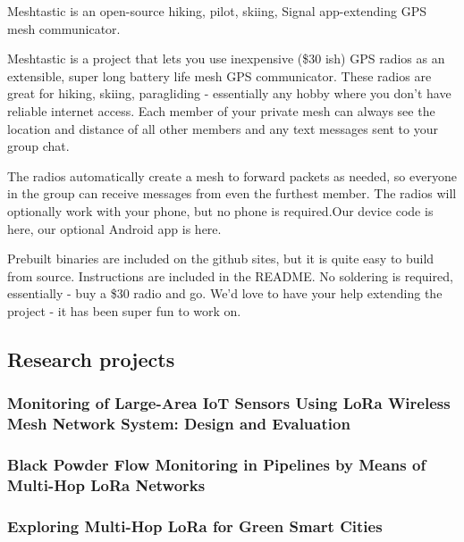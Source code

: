 						
					Meshtastic is an open-source hiking, pilot, skiing, Signal app-extending GPS mesh communicator.
					
					Meshtastic is a project that lets you use inexpensive (\$30 ish) GPS radios as an extensible, super long battery life mesh GPS communicator. These radios are great for hiking, skiing, paragliding - essentially any hobby where you don’t have reliable internet access. Each member of your private mesh can always see the location and distance of all other members and any text messages sent to your group chat.
					
					The radios automatically create a mesh to forward packets as needed, so everyone in the group can receive messages from even the furthest member. The radios will optionally work with your phone, but no phone is required.Our device code is here, our optional Android app is here.
					
					Prebuilt binaries are included on the github sites, but it is quite easy to build from source. Instructions are included in the README. No soldering is required, essentially - buy a \$30 radio and go. We'd love to have your help extending the project - it has been super fun to work on.
		
		\subsection{Research projects}
		
			\subsubsection{Monitoring of Large-Area IoT Sensors Using LoRa Wireless Mesh Network System: Design and Evaluation}
			
			\subsubsection{Black Powder Flow Monitoring in Pipelines by Means of Multi-Hop LoRa Networks}
		
			\subsubsection{Exploring Multi-Hop LoRa for Green Smart Cities}
			
